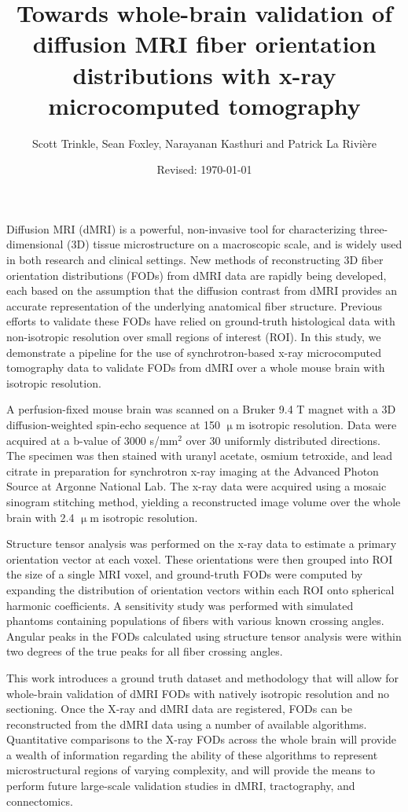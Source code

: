 \documentclass[11pt]{article}
\title{\vspace{-2em}Towards whole-brain validation of diffusion MRI fiber
  orientation distributions with x-ray microcomputed tomography}
\author{Scott Trinkle, Sean Foxley, Narayanan Kasthuri and Patrick La Rivi\`ere}
\date{Revised: \today}
\begin{document}
\maketitle

Diffusion MRI (dMRI) is a powerful, non-invasive tool for characterizing
three-dimensional (3D) tissue microstructure on a macroscopic scale, and is
widely used in both research and clinical settings. New methods of
reconstructing 3D fiber orientation distributions (FODs) from dMRI data are
rapidly being developed, each based on the assumption that the diffusion
contrast from dMRI provides an accurate representation of the underlying
anatomical fiber structure. Previous efforts to validate these FODs have relied
on ground-truth histological data with non-isotropic resolution over small
regions of interest (ROI). In this study, we demonstrate a pipeline for the use
of synchrotron-based x-ray microcomputed tomography data to
validate FODs from dMRI over a whole mouse brain with isotropic resolution.

A perfusion-fixed mouse brain was scanned on a Bruker 9.4 T magnet with a 3D
diffusion-weighted spin-echo sequence at 150 $\upmu$m isotropic resolution. Data
were acquired at a b-value of 3000 s/mm$^2$ over 30 uniformly distributed
directions. The specimen was then stained with uranyl acetate, osmium tetroxide,
and lead citrate in preparation for synchrotron x-ray imaging at the Advanced
Photon Source at Argonne National Lab. The x-ray data were acquired using a
mosaic sinogram stitching method, yielding a reconstructed image volume over the
whole brain with 2.4 $\upmu$m isotropic resolution.

Structure tensor analysis was performed on the x-ray data to estimate a primary
orientation vector at each voxel. These orientations were then grouped into ROI
the size of a single MRI voxel, and ground-truth FODs were computed by expanding
the distribution of orientation vectors within each ROI onto spherical harmonic
coefficients. A sensitivity study was performed with simulated phantoms containing populations
of fibers with various known crossing angles. Angular peaks in the FODs
calculated using structure tensor analysis were within two degrees of the true
peaks for all fiber crossing angles. 

This work introduces a ground truth dataset and methodology that will allow for
whole-brain validation of dMRI FODs with natively isotropic resolution and no
sectioning. Once the X-ray and dMRI data are registered, FODs can be
reconstructed from the dMRI data using a number of available
algorithms. Quantitative comparisons to the X-ray FODs across the whole brain
will provide a wealth of information regarding the ability of these algorithms
to represent microstructural regions of varying complexity, and will provide the
means to perform future large-scale validation studies in dMRI, tractography,
and connectomics.
\end{document}
